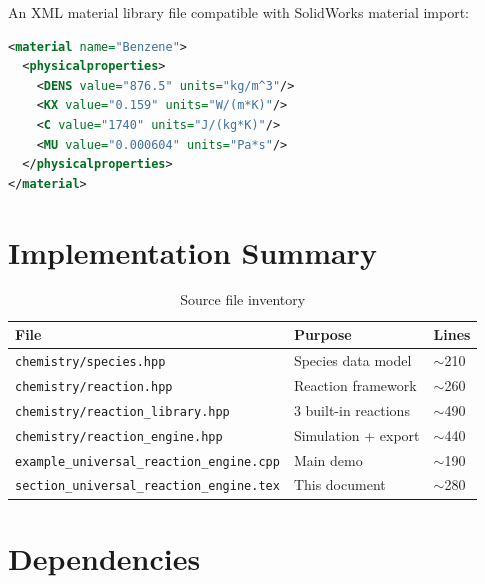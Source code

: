 \documentclass[11pt,a4paper]{article}
\begin{document}
An XML material library file compatible with SolidWorks material import:

\begin{lstlisting}[language=XML,caption={SolidWorks material XML format}]
<material name="Benzene">
  <physicalproperties>
    <DENS value="876.5" units="kg/m^3"/>
    <KX value="0.159" units="W/(m*K)"/>
    <C value="1740" units="J/(kg*K)"/>
    <MU value="0.000604" units="Pa*s"/>
  </physicalproperties>
</material>
\end{lstlisting}

\section{Implementation Summary}
\label{sec:implementation}

\begin{table}[h]
\centering
\caption{Source file inventory}
\label{tab:files}
\begin{tabular}{@{}lll@{}}
\toprule
File & Purpose & Lines \\
\midrule
\texttt{chemistry/species.hpp}         & Species data model      & $\sim$210 \\
\texttt{chemistry/reaction.hpp}        & Reaction framework      & $\sim$260 \\
\texttt{chemistry/reaction\_library.hpp} & 3 built-in reactions  & $\sim$490 \\
\texttt{chemistry/reaction\_engine.hpp}  & Simulation + export   & $\sim$440 \\
\texttt{example\_universal\_reaction\_engine.cpp} & Main demo    & $\sim$190 \\
\texttt{section\_universal\_reaction\_engine.tex} & This document & $\sim$280 \\
\bottomrule
\end{tabular}
\end{table}

\section{Dependencies}
\label{sec:deps}
\end{document}
